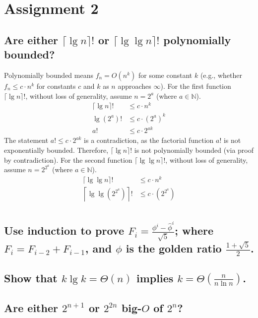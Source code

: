 \chapter{Assignment 2}


\section[Problem 1]{Are either $\lceil \lg n \rceil!$ or $\lceil \lg \lg n \rceil!$ polynomially bounded?}
Polynomially bounded means $f_n = O(n^k)$ for some constant $k$ (e.g., whether $f_n \leq c \cdot n^k$ for constants $c$ and $k$ as $n$ approaches $\infty$). For the first function $\lceil \lg n \rceil!$, without loss of generality, assume $n = 2^a$ (where $a \in \mathbb{N}$). 
\begin{align*}
	\lceil \lg n \rceil ! & \leq c \cdot n^k \\
	\lg (2^a) ! & \leq c \cdot (2^a)^k \\
	a! & \leq c \cdot 2^{ak}
\end{align*}
The statement $a! \leq c \cdot 2^{ak}$ is a contradiction, as the factorial function $a!$ is not exponentially bounded. Therefore, $\lceil \lg n \rceil!$ is not polynomially bounded (via proof by contradiction). For the second function $\lceil \lg \lg n \rceil!$, without loss of generality, assume $n = 2^{2^a}$ (where $a \in \mathbb{N}$).
\begin{align*}
	\lceil \lg \lg n \rceil! & \leq c \cdot n^k \\
	\left\lceil \lg \lg \left( 2^{2^a} \right) \right\rceil! & \leq c \cdot \left( 2^{2^a} \right) \\
\end{align*}

\section[Problem 2]{Use induction to prove $F_i = \frac{\phi^i - \hat{\phi}^i}{\sqrt{5}}$; where $F_i = F_{i-2} + F_{i-1}$, and $\phi$ is the golden ratio $\frac{1 + \sqrt{5}}{2}$.}

\section[Problem 3]{Show that $k \lg k = \Theta(n)$ implies $k = \Theta\left(\frac{n}{n \ln n}\right)$.}

\section[Problem 4]{Are either $2^{n + 1}$ or $2^{2n}$ big-$O$ of $2^n$?}

